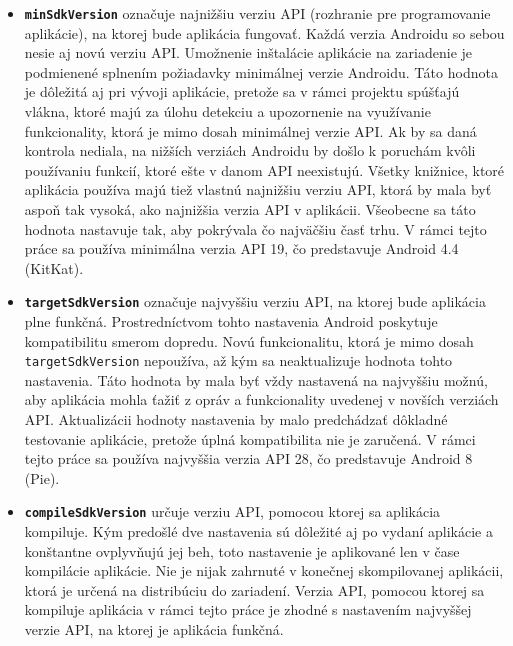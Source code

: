 \begin{itemize}

\item{\texttt{\textbf{minSdkVersion}} označuje najnižšiu verziu API (rozhranie pre programovanie aplikácie), na ktorej bude aplikácia fungovať.  Každá verzia Androidu so sebou nesie aj novú verziu API. Umožnenie inštalácie aplikácie na zariadenie je podmienené splnením požiadavky minimálnej verzie Androidu. Táto hodnota je dôležitá aj pri vývoji aplikácie, pretože sa v rámci projektu spúšťajú vlákna, ktoré majú za úlohu detekciu a upozornenie na využívanie funkcionality, ktorá je mimo dosah minimálnej verzie API. Ak by sa daná kontrola nediala, na nižších verziách Androidu by došlo k poruchám kvôli používaniu funkcií, ktoré ešte v danom API neexistujú. Všetky knižnice, ktoré aplikácia používa majú tiež vlastnú najnižšiu verziu API, ktorá by mala byť aspoň tak vysoká, ako najnižšia verzia API v aplikácii. Všeobecne sa táto hodnota nastavuje tak, aby pokrývala čo najväčšiu časť trhu. V rámci tejto práce sa používa minimálna verzia API 19, čo predstavuje Android 4.4 (KitKat).}

\item{\texttt{\textbf{targetSdkVersion}} označuje najvyššiu verziu API, na ktorej bude aplikácia plne funkčná. Prostredníctvom tohto nastavenia Android poskytuje kompatibilitu smerom dopredu. Novú funkcionalitu, ktorá je mimo dosah \texttt{targetSdkVersion} nepoužíva, až kým sa neaktualizuje hodnota tohto nastavenia. Táto hodnota by mala byť vždy nastavená na najvyššiu možnú, aby aplikácia mohla ťažiť z opráv a funkcionality uvedenej v novších verziách API. Aktualizácii hodnoty nastavenia by malo predchádzať dôkladné testovanie aplikácie, pretože úplná kompatibilita nie je zaručená. V rámci tejto práce sa používa najvyššia verzia API 28, čo predstavuje Android 8 (Pie).}

\item{\texttt{\textbf{compileSdkVersion}} určuje verziu API, pomocou ktorej sa aplikácia kompiluje. Kým predošlé dve nastavenia sú dôležité aj po vydaní aplikácie a konštantne ovplyvňujú jej beh, toto nastavenie je aplikované len v čase kompilácie aplikácie. Nie je nijak zahrnuté v konečnej skompilovanej aplikácii, ktorá je určená na distribúciu do zariadení. Verzia API, pomocou ktorej sa kompiluje aplikácia v rámci tejto práce je zhodné s nastavením najvyššej verzie API, na ktorej je aplikácia funkčná.}

\end{itemize}


